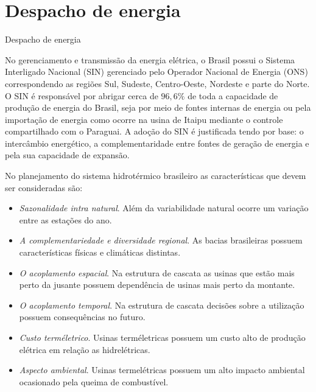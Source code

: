 \documentclass[12pt]{beamer}
\begin{document}
\section{Despacho de energia}
\begin{frame}{Despacho de energia}
	\begin{justify}	
	No gerenciamento e transmiss\~ao da energia el\'etrica, o Brasil possui o Sistema Interligado Nacional
	(SIN) gerenciado pelo Operador Nacional de Energia (ONS) correspondendo as regi\~oes Sul, Sudeste,
	Centro-Oeste, Nordeste e parte do Norte. O SIN \'e respons\'avel por abrigar cerca de
	$96,6\%$ de toda a capacidade de produ\c c\~ao de energia do Brasil, seja por meio de fontes internas de energia
	ou pela importa\c c\~ao de energia como ocorre na usina de Itaipu mediante o controle compartilhado com o
	Paraguai. A ado\c c\~ao do SIN \'e justificada tendo por base: o interc\^ambio energ\'etico, a
	complementaridade entre fontes de gera\c c\~ao de energia e pela sua capacidade de expans\~ao.
	\end{justify}
\end{frame}

\begin{frame}
	\begin{justify}	
		No planejamento do sistema hidrot\'ermico brasileiro as caracter\'isticas que devem ser consideradas s\~ao:
		\begin{itemize}
		\item \textit{Sazonalidade intra natural}. Al\'em da variabilidade natural ocorre um varia\c c\~ao entre as esta\c
			c\~oes do ano. 
		\item \textit{A complementariedade e diversidade regional}. As bacias brasileiras possuem caracter\'isticas
			f\'isicas e clim\'aticas distintas. 
		\item \textit{O acoplamento espacial}. Na estrutura de cascata as usinas que est\~ao mais perto da jusante possuem depend\^encia
			de usinas mais perto da montante.
		\end{itemize}
	\end{justify}
\end{frame}

\begin{frame}
	\begin{justify}	
		\begin{itemize}
		\item \textit{O acoplamento temporal}. Na estrutura de cascata decis\~oes sobre a utiliza\c c\~ao possuem
			consequ\^encias no futuro. 
		\item \textit{Custo term\'eletrico}. Usinas term\'eletricas possuem um custo alto de produ\c c\~ao el\'etrica em
			rela\c c\~ao as hidrel\'etricas.
		\item \textit{Aspecto ambiental}. Usinas termel\'etricas possuem um alto impacto ambiental ocasionado pela queima de
			combust\'ivel.
	\end{itemize}
	\end{justify}
\end{frame}
\end{document}
